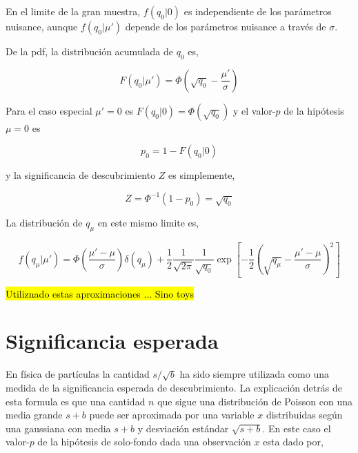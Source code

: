 En el limite de la gran muestra, $f(q_0|0)$ es independiente de los parámetros
nuisance, aunque $f(q_0|\mu')$ depende de los parámetros nuisance a través de
$\sigma$.

De la pdf, la distribución acumulada de $q_0$ es,

\begin{equation}
  F(q_0|\mu') = \Phi \left( \sqrt{q_0} - \frac{\mu'}{\sigma} \right)
\end{equation}

Para el caso especial $\mu' = 0$ es $F(q_0|0) = \Phi(\sqrt{q_0})$ y el valor-$p$
de la hipótesis $\mu=0$ es

\begin{equation}
  p_0 = 1 - F(q_0|0)
\end{equation}

y la significancia de descubrimiento $Z$ es simplemente,

\begin{equation}
  Z = \Phi^{-1} (1-p_0) = \sqrt{q_0}
\end{equation}

La distribución de $q_\mu$ en este mismo limite es,

\begin{equation}
  f(q_\mu|\mu') = \Phi\left(\frac{\mu'-\mu}{\sigma}\right) \delta(q_\mu) +
  \frac{1}{2}\frac{1}{\sqrt{2\pi}}\frac{1}{\sqrt{q_0}} \exp \left[ -\frac{1}{2}
    \left( \sqrt{q_\mu} - \frac{\mu'-\mu}{\sigma} \right)^2\right]
\end{equation}

\hl{Utiliznado estas aproximaciones ... Sino toys}


\section{Significancia esperada} %


En física de partículas la cantidad $s/\sqrt{b}$ ha sido siempre utilizada como
una medida de la significancia esperada de descubrimiento. La explicación detrás
de esta formula es que una cantidad $n$ que sigue una distribución de Poisson con
una media grande $s+b$ puede ser aproximada por una variable $x$ distribuidas
según una gaussiana con media $s+b$ y desviación estándar $\sqrt{s+b}$. En este
caso el valor-$p$ de la hipótesis de solo-fondo dada una observación $x$ esta
dado por,

